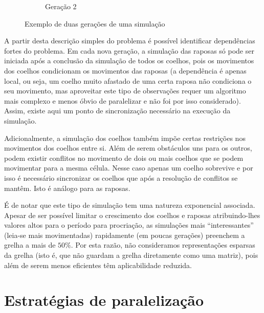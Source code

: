 \documentclass[10pt,a4paper,oneside]{article}
\begin{document}
\begin{figure}
\begin{subfigure}[b]{0.3\textwidth}
      \caption{Geração 2}
    \end{subfigure}
    \caption{Exemplo de duas gerações de uma simulação}
    \label{fig:sim}
\end{figure}

A partir desta descrição simples do problema é possível identificar
dependências fortes do problema. Em cada nova geração, a simulação das
raposas só pode ser iniciada após a conclusão da simulação de todos os
coelhos, pois os movimentos dos coelhos condicionam os movimentos das
raposas (a dependência é apenas local, ou seja, um coelho muito
afastado de uma certa raposa não condiciona o seu movimento, mas
aproveitar este tipo de observações requer um algoritmo mais complexo
e menos óbvio de paralelizar e não foi por isso considerado). Assim,
existe aqui um ponto de sincronização necessário na execução da
simulação.

Adicionalmente, a simulação dos coelhos também impõe certas restrições
nos movimentos dos coelhos entre si. Além de serem obstáculos uns para
os outros, podem existir conflitos no movimento de dois ou mais
coelhos que se podem movimentar para a mesma célula. Nesse caso apenas
um coelho sobrevive e por isso é necessário sincronizar os coelhos que
após a resolução de conflitos se mantêm. Isto é análogo para as
raposas.

É de notar que este tipo de simulação tem uma natureza exponencial
associada. Apesar de ser possível limitar o crescimento dos coelhos e
raposas atribuindo-lhes valores altos para o período para procriação,
as simulações mais ``interessantes'' (leia-se mais movimentadas)
rapidamente (em poucas gerações) preenchem a grelha a mais de
$50\%$. Por esta razão, não consideramos representações esparsas da
grelha (isto é, que não guardam a grelha diretamente como uma matriz),
pois além de serem menos eficientes têm aplicabilidade reduzida.


\section{Estratégias de paralelização}
\label{sec:par}


\end{document}
